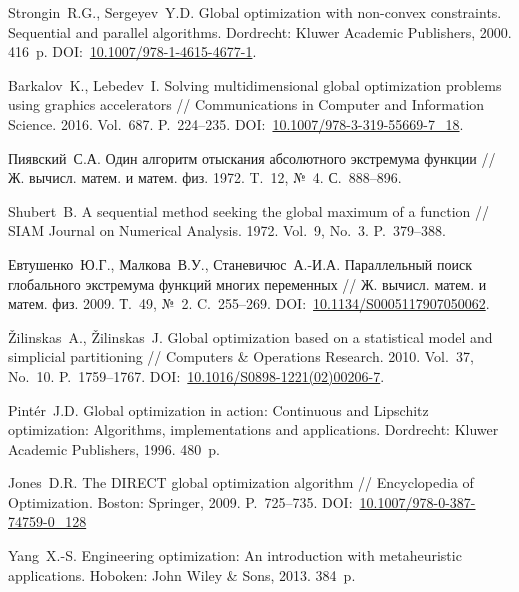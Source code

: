 \documentclass[11pt, oneside, a4paper]{article}
\begin{document}
\begin{biblio}

Strongin~R.G., Sergeyev~Y.D. Global optimization with non-convex constraints. Sequential and parallel algorithms. Dordrecht: Kluwer Academic Publishers, 2000. 416~p. DOI:~\href{https://doi.org/10.1007/978-1-4615-4677-1}{10.1007/978-1-4615-4677-1}.

Barkalov~K., Lebedev~I. Solving multidimensional global optimization problems using graphics accelerators // Communications in Computer and Information Science. 2016. Vol.~687. P.~224--235. DOI:~\href{http://dx.doi.org/10.1007/978-3-319-55669-7_18}{10.1007/978-3-319-55669-7\_18}.

Пиявский~С.А. Один алгоритм отыскания абсолютного экстремума функции // Ж. вычисл. матем. и матем. физ. 1972. T.~12, №~4. С.~888--896.

Shubert~B. A sequential method seeking the global maximum of a function // SIAM Journal on Numerical Analysis. 1972. Vol.~9, No.~3. P.~379--388.

Евтушенко~Ю.Г., Малкова~В.У., Станевичюс~А.-И.А. Параллельный поиск глобального экстремума функций многих переменных // Ж. вычисл. матем. и матем. физ. 2009. Т.~49, №~2. C.~255--269. DOI:~\href{https://doi.org/10.1134/S0005117907050062}{10.1134/S0005117907050062}.

Žilinskas~A., Žilinskas~J. Global optimization based on a statistical model and simplicial partitioning // Computers \& Operations Research. 2010. Vol.~37, No.~10. P.~1759--1767. DOI:~\href{http://dx.doi.org/10.1016/S0898-1221(02)00206-7}{10.1016/S0898-1221(02)00206-7}.

Pintér~J.D. Global optimization in action: Continuous and Lipschitz optimization: Algorithms, implementations and applications. Dordrecht: Kluwer Academic Publishers, 1996. 480~p.

Jones~D.R. The DIRECT global optimization algorithm // Encyclopedia of Optimization. Boston: Springer, 2009. P.~725--735. DOI:~\href{https://doi.org/10.1007/978-0-387-74759-0_128}{10.1007/978-0-387-74759-0\_128}

Yang~X.-S. Engineering optimization: An introduction with metaheuristic applications. Hoboken: John Wiley \& Sons, 2013. 384~p.


\end{biblio}
\end{document}
